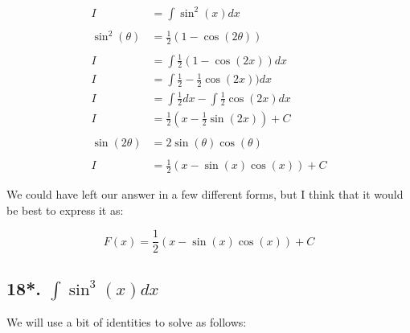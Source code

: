 \documentclass[12pt]{article}
\begin{document}
\begin{align}
    I              & = \int \sin^2(x) dx                                    \\
    \nonumber                                                               \\
    \sin^2(\theta) & = \frac{1}{2}(1-\cos(2\theta))                         \\
    \nonumber                                                               \\
    I              & = \int \frac{1}{2}(1-\cos(2x)) dx                      \\
    I              & = \int \frac{1}{2} - \frac{1}{2}\cos(2x)) dx           \\
    I              & = \int \frac{1}{2} dx - \int \frac{1}{2}\cos(2x) dx    \\
    I              & = \frac{1}{2}\left(x - \frac{1}{2}\sin(2x) \right) + C \\
    \nonumber                                                               \\
    \sin(2\theta)  & = 2\sin(\theta)\cos(\theta)                            \\
    \nonumber                                                               \\
    I              & = \frac{1}{2}\left(x - \sin(x)\cos(x) \right) + C
\end{align}


We could have left our answer in a few different forms, but I think that it would be best to express it as:

$$
    F(x) = \frac{1}{2}\left(x - \sin(x)\cos(x) \right) + C
$$

\subsection*{18*. $\int \sin^3(x) dx$}

We will use a bit of identities to solve as follows:
\end{document}
